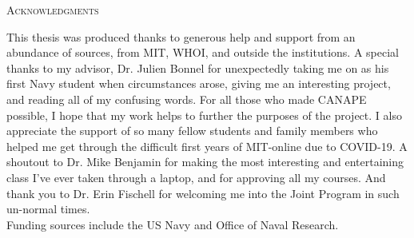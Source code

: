 
\noindent
\begin{singlespace}
{\parindent0pt
	{\large \textsc{Acknowledgments}}

	This thesis was produced thanks to generous help and support from an abundance of sources, from MIT, WHOI, and outside the institutions. A special thanks to my advisor, Dr. Julien Bonnel for unexpectedly taking me on as his first Navy student when circumstances arose, giving me an interesting project, and reading all of my confusing words. For all those who made CANAPE possible, I hope that my work helps to further the purposes of the project. I also appreciate the support of so many fellow students and family members who helped me get through the difficult first years of MIT-online due to COVID-19. A shoutout to Dr. Mike Benjamin for making the most interesting and entertaining class I've ever taken through a laptop, and for approving all my courses. And thank you to Dr. Erin Fischell for welcoming me into the Joint Program in such un-normal times. \\
	Funding sources include the US Navy and Office of Naval Research. 
}

\end{singlespace}

\newpage
\null
\newpage